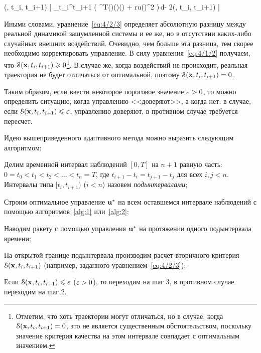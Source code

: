     \funcS(, t_i, t_{i+1}) \eqdef \Biggl| \int\limits_{t_i}^{t_{i+1}} \bigl( ^T(\tau)(\tau)(\tau) + ru(\tau)^2 \bigr)\,d\tau - 2\optF(, t_i, t_{i+1}) \Biggr| 
\eeq

Иными словами, уравнение~\ref{eq:4/2/3} определяет абсолютную разницу между реальной динамикой зашумленной системы и ее же, но в отсутствии каких-либо случайных внешних воздействий. Очевидно, чем больше эта разница, тем скорее необходимо корректировать управление. В силу уравнения~\vref{eq:4/1/2} получаем, что $\mathcal{S}(\mathbf{x}, t_i, t_{i+1}) \geqslant 0$\footnote{Отметим, что хоть траектории могут отличаться, но в случае, когда $\mathcal{S}(\mathbf{x}, t_i, t_{i+1}) = 0$, это не является существенным обстоятельством, поскольку значение критерия качества на этом интервале совпадает с оптимальным значением.}. В случае же, когда воздействий не происходит, реальная траектория не будет отличаться от оптимальной, поэтому $\mathcal{S}(\mathbf{x}, t_i, t_{i+1}) = 0$.

Таким образом, если ввести некоторое пороговое значение $\varepsilon > 0$, то можно определить ситуацию, когда управлению <<доверяют>>, а когда нет: в случае, если $\mathcal{S}(\mathbf{x}, t_i, t_{i+1}) \leqslant \varepsilon$, управлению доверяют, в противном случае требуется пересчет.

Идею вышеприведенного адаптивного метода можно выразить следующим алгоритмом:

    \benum
        \item
            Делим временной интервал наблюдений $[0, T]$ на $n+1$ равную часть: $0 = t_0 < t_1 < t_2 < \ldots < t_{n} = T$, где $t_{i+1}-t_i = t_{j+1}-t_j$ для всех $i, j < n$. Интервалы типа $[t_i, t_{i+1})$ ($i<n$) назовем \emph{подынтервалами};

        \item
            Строим оптимальное управление $\mathbf{u}^{*}$ на всем оставшемся интервале наблюдений с помощью алгоритмов~\ref{alg:1} или~\vref{alg:2};

        \item
            Наводим ракету с помощью управления $\mathbf{u}^{*}$ на протяжении одного подынтервала времени;

        \item
            На открытой границе подынтервала производим расчет вторичного критерия $\mathcal{S}(\mathbf{x}, t_i, t_{i+1})$ (например, заданного уравнением~\ref{eq:4/2/3});

        \item
            Если $\mathcal{S}(\mathbf{x}, t_i, t_{i+1}) \leqslant \varepsilon$ ($\varepsilon > 0$), то переходим на шаг 3, в противном случае переходим на шаг 2.

